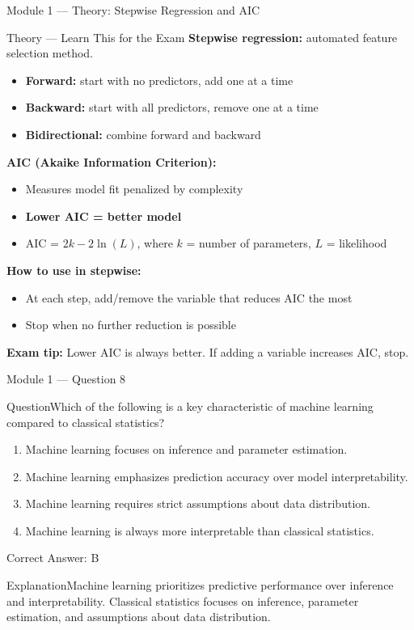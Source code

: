 \documentclass[aspectratio=169,10pt]{beamer}
\newcommand{\question}[1]{\begin{block}{Question}#1\end{block}}
\newcommand{\options}[4]{%
	\begin{enumerate}[label=\Alph*.,leftmargin=*]
		\item #1
		\item #2
		\item #3
		\item #4
	\end{enumerate}
}
\newcommand{\answerbox}[1]{\begin{exampleblock}{Correct Answer: #1}\end{exampleblock}}
\newcommand{\explain}[1]{\begin{block}{Explanation}#1\end{block}}
\newcommand{\theory}[1]{%
	\begin{block}{Theory --- Learn This for the Exam}
		\small #1
	\end{block}
}
\begin{document}
	\begin{frame}{Module 1 --- Theory: Stepwise Regression and AIC}
		\theory{
			\textbf{Stepwise regression:} automated feature selection method.
			\begin{itemize}
				\item \textbf{Forward:} start with no predictors, add one at a time
				\item \textbf{Backward:} start with all predictors, remove one at a time
				\item \textbf{Bidirectional:} combine forward and backward
			\end{itemize}
			\textbf{AIC (Akaike Information Criterion):}
			\begin{itemize}
				\item Measures model fit penalized by complexity
				\item \textbf{Lower AIC = better model}
				\item AIC = $2k - 2\ln(L)$, where $k$ = number of parameters, $L$ = likelihood
			\end{itemize}
			\textbf{How to use in stepwise:}
			\begin{itemize}
				\item At each step, add/remove the variable that reduces AIC the most
				\item Stop when no further reduction is possible
			\end{itemize}
			\textbf{Exam tip:} Lower AIC is always better. If adding a variable increases AIC, stop.
		}
	\end{frame}
	
	\begin{frame}{Module 1 --- Question 8}
		\question{Which of the following is a key characteristic of machine learning compared to classical statistics?}
		\options{Machine learning focuses on inference and parameter estimation.}{Machine learning emphasizes prediction accuracy over model interpretability.}{Machine learning requires strict assumptions about data distribution.}{Machine learning is always more interpretable than classical statistics.}
		\answerbox{B}
		\explain{Machine learning prioritizes predictive performance over inference and interpretability. Classical statistics focuses on inference, parameter estimation, and assumptions about data distribution.}
	\end{frame}
	
\end{document}
